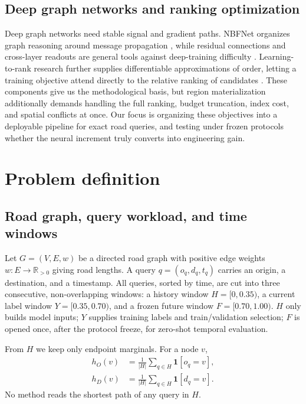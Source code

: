 \documentclass[5p,twocolumn,authoryear]{elsarticle}
\begin{document}
\subsection{Deep graph networks and ranking optimization}

Deep graph networks need stable signal and gradient paths. NBFNet organizes graph
reasoning around message propagation \citep{zhu2021nbfnet}, while residual connections
and cross-layer readouts are general tools against deep-training difficulty
\citep{li2020deepergcn,touvron2021layerscale}. Learning-to-rank research further
supplies differentiable approximations of order, letting a training objective attend
directly to the relative ranking of candidates \citep{jagerman2022rax}. These
components give us the methodological basis, but region materialization additionally
demands handling the full ranking, budget truncation, index cost, and spatial
conflicts at once. Our focus is organizing these objectives into a deployable pipeline
for exact road queries, and testing under frozen protocols whether the neural
increment truly converts into engineering gain.

\section{Problem definition}

\subsection{Road graph, query workload, and time windows}

Let $G=(V,E,w)$ be a directed road graph with positive edge weights
$w:E\rightarrow\mathbb{R}_{>0}$ giving road lengths. A query $q=(o_q,d_q,t_q)$ carries an
origin, a destination, and a timestamp. All queries, sorted by time, are cut into three
consecutive, non-overlapping windows: a history window $H=[0,0.35)$, a current label window
$Y=[0.35,0.70)$, and a frozen future window $F=[0.70,1.00)$. $H$ only builds model inputs;
$Y$ supplies training labels and train/validation selection; $F$ is opened once, after the
protocol freeze, for zero-shot temporal evaluation.

From $H$ we keep only endpoint marginals. For a node $v$,
\begin{equation}
  \begin{aligned}
  h_O(v)&=\frac{1}{|H|}\sum_{q\in H}\mathbf{1}[o_q=v],\\
  h_D(v)&=\frac{1}{|H|}\sum_{q\in H}\mathbf{1}[d_q=v].
  \end{aligned}
\end{equation}
No method reads the shortest path of any query in $H$.
\end{document}
